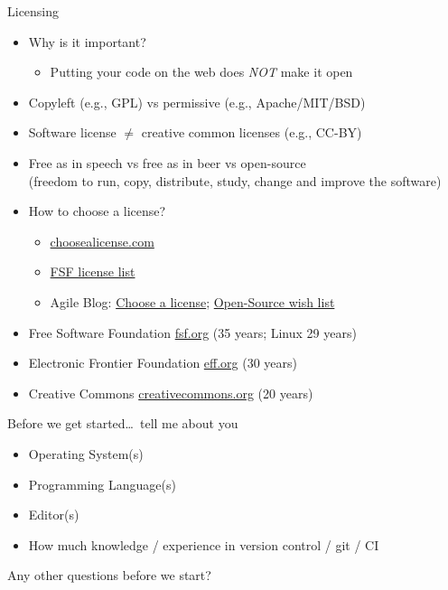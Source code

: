 \documentclass[aspectratio=169]{beamer}
\begin{document}
\begin{frame}
  {Licensing}

  \begin{itemize}
    \item Why is it important?
      \begin{itemize}
        \item Putting your code on the web does \emph{NOT} make it open
      \end{itemize}
    \item Copyleft (e.g., GPL) vs permissive (e.g., Apache/MIT/BSD)
    \item Software license $\ne$ creative common licenses (e.g., CC-BY)
    \item \alert{Free as in speech} vs free as in beer vs open-source\\
      (freedom to run, copy, distribute, study, change and improve the software)
    \item How to choose a license?
      \begin{itemize}
        \item \href{https://choosealicense.com}{choosealicense.com}
        \item \href{https://www.gnu.org/licenses/license-recommendations.html}{FSF license list}
        \item Agile Blog: \href{https://agilescientific.com/blog/2021/2/17/which-open-licence-should-i-choose}{Choose a license};
        \href{https://agilescientific.com/blog/2021/5/24/an-open-source-wish-list}{Open-Source wish list}
      \end{itemize}
    \item Free Software Foundation \href{https://www.fsf.org}{fsf.org} (35 years; Linux 29 years)
    \item Electronic Frontier Foundation \href{https://www.eff.org/}{eff.org} (30 years)
    \item Creative Commons \href{https://creativecommons.org}{creativecommons.org} (20 years)
  \end{itemize}

\end{frame}

\begin{frame}
  {Before we get started\ldots\ tell me about you}
    \begin{itemize}\itemsep.5cm
      \item Operating System(s)
      \item Programming Language(s)
      \item Editor(s)
      \item How much knowledge / experience in version control / git / CI
    \end{itemize}

    \vfill
    \centering

    Any other questions before we start?

\end{frame}
\end{document}
